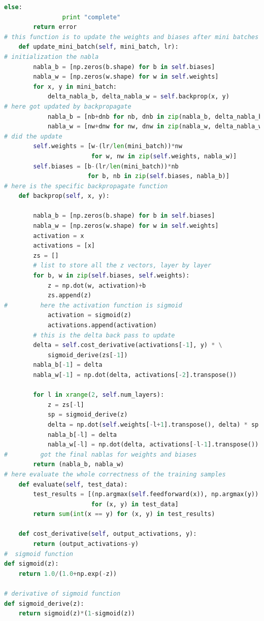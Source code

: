 \documentclass[12pt,a4paper]{article}
\begin{document}
\begin{lstlisting}[language=Python]
            else:
                print "complete"
        return error
# this function is to update the weights and biases after mini batches
    def update_mini_batch(self, mini_batch, lr):
# initialization the nabla
        nabla_b = [np.zeros(b.shape) for b in self.biases]
        nabla_w = [np.zeros(w.shape) for w in self.weights]
        for x, y in mini_batch:
            delta_nabla_b, delta_nabla_w = self.backprop(x, y)
# here got updated by backpropagate
            nabla_b = [nb+dnb for nb, dnb in zip(nabla_b, delta_nabla_b)]
            nabla_w = [nw+dnw for nw, dnw in zip(nabla_w, delta_nabla_w)]
# did the update
        self.weights = [w-(lr/len(mini_batch))*nw
                        for w, nw in zip(self.weights, nabla_w)]
        self.biases = [b-(lr/len(mini_batch))*nb
                       for b, nb in zip(self.biases, nabla_b)]
# here is the specific backpropagate function
    def backprop(self, x, y):

        nabla_b = [np.zeros(b.shape) for b in self.biases]
        nabla_w = [np.zeros(w.shape) for w in self.weights]
        activation = x
        activations = [x] 
        zs = [] 
        # list to store all the z vectors, layer by layer
        for b, w in zip(self.biases, self.weights):
            z = np.dot(w, activation)+b
            zs.append(z)
#         here the activation function is sigmoid
            activation = sigmoid(z)
            activations.append(activation)
        # this is the delta back pass to update
        delta = self.cost_derivative(activations[-1], y) * \
            sigmoid_derive(zs[-1])
        nabla_b[-1] = delta
        nabla_w[-1] = np.dot(delta, activations[-2].transpose())
        
        for l in xrange(2, self.num_layers):
            z = zs[-l]
            sp = sigmoid_derive(z)
            delta = np.dot(self.weights[-l+1].transpose(), delta) * sp
            nabla_b[-l] = delta
            nabla_w[-l] = np.dot(delta, activations[-l-1].transpose())
#         got the final nablas for weights and biases
        return (nabla_b, nabla_w)
# here evaluate the whole correctness of the training samples
    def evaluate(self, test_data):
        test_results = [(np.argmax(self.feedforward(x)), np.argmax(y))
                        for (x, y) in test_data]
        return sum(int(x == y) for (x, y) in test_results)

    def cost_derivative(self, output_activations, y):
        return (output_activations-y)
#  sigmoid function
def sigmoid(z):
    return 1.0/(1.0+np.exp(-z))

# derivative of sigmoid function
def sigmoid_derive(z):
    return sigmoid(z)*(1-sigmoid(z))

\end{lstlisting}
\end{document}
